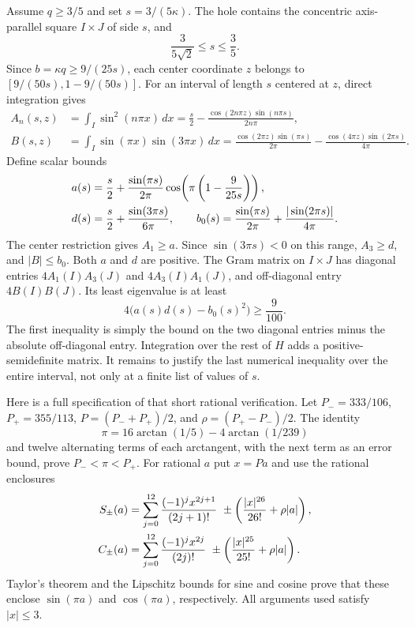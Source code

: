 \documentclass[11pt,reqno]{amsart}
\numberwithin{equation}{section}
\begin{document}
Assume $q\geq3/5$ and set $s=3/(5\kappa)$. The hole contains the
concentric axis-parallel square $I\times J$ of side $s$, and
\[
 \frac{3}{5\sqrt2}\leq s\leq\frac35.
\]
Since $b=\kappa q\geq9/(25s)$, each center coordinate $z$ belongs to
$[9/(50s),1-9/(50s)]$. For an interval of length $s$ centered at $z$,
direct integration gives
\begin{align*}
 A_n(s,z)&=\int_I\sin^2(n\pi x)\,dx
   =\frac{s}{2}-\frac{\cos(2n\pi z)\sin(n\pi s)}{2n\pi},\\
 B(s,z)&=\int_I\sin(\pi x)\sin(3\pi x)\,dx
   =\frac{\cos(2\pi z)\sin(\pi s)}{2\pi}
      -\frac{\cos(4\pi z)\sin(2\pi s)}{4\pi}.
\end{align*}
Define scalar bounds
\begin{align}
 a(s)&=\frac{s}{2}+\frac{\sin(\pi s)}{2\pi}
              \cos\!\left(\pi\left(1-\frac{9}{25s}\right)\right),
       \label{rot:gram-scalars}\\
 d(s)&=\frac{s}{2}+\frac{\sin(3\pi s)}{6\pi},\qquad
 b_0(s)=\frac{\sin(\pi s)}{2\pi}
                   +\frac{|\sin(2\pi s)|}{4\pi}.\notag
\end{align}
The center restriction gives $A_1\geq a$. Since $\sin(3\pi s)<0$
on this range, $A_3\geq d$, and $|B|\leq b_0$. Both $a$ and $d$ are
positive. The Gram matrix on $I\times J$ has diagonal entries
$4A_1(I)A_3(J)$ and $4A_3(I)A_1(J)$, and off-diagonal entry
$4B(I)B(J)$. Its least eigenvalue is at least
\begin{equation}\label{rot:gram-scalar-target}
 4\bigl(a(s)d(s)-b_0(s)^2\bigr)\geq\frac9{100}.
\end{equation}
The first inequality is simply the bound on the two diagonal entries
minus the absolute off-diagonal entry. Integration over the rest of
$H$ adds a positive-semidefinite matrix. It remains to justify the
last numerical inequality over the entire interval, not only at a
finite list of values of $s$.

Here is a full specification of that short rational verification.
Let $P_-=333/106$, $P_+=355/113$, $P=(P_-+P_+)/2$, and
$\rho=(P_+-P_-)/2$. The identity
\begin{equation}\label{rot:machin}
 \pi=16\arctan(1/5)-4\arctan(1/239)
\end{equation}
and twelve alternating terms of each arctangent, with the next term as
an error bound, prove $P_-<\pi<P_+$. For rational $a$ put $x=Pa$ and
use the rational enclosures
\begin{align}
 S_\pm(a)&=\sum_{j=0}^{12}\frac{(-1)^jx^{2j+1}}{(2j+1)!}
       \ \pm\left(\frac{|x|^{26}}{26!}+\rho|a|\right),\notag\\
 C_\pm(a)&=\sum_{j=0}^{12}\frac{(-1)^jx^{2j}}{(2j)!}
       \ \pm\left(\frac{|x|^{25}}{25!}+\rho|a|\right).
       \label{rot:trig-enclosures}
\end{align}
Taylor's theorem and the Lipschitz bounds for sine and cosine prove
that these enclose $\sin(\pi a)$ and $\cos(\pi a)$, respectively.
All arguments used satisfy $|x|\leq3$.
\end{document}
